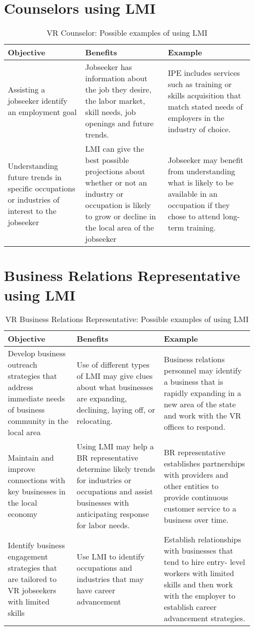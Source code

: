 \documentclass[]{book}
\theoremstyle{definition}
\theoremstyle{definition}
\theoremstyle{definition}
\theoremstyle{remark}
\begin{document}
\section{Counselors using LMI}\label{counselors-using-lmi}

\begin{longtable}[t]{lll}
\caption{\label{tab:unnamed-chunk-2}VR Counselor: Possible examples of using LMI}\\
\toprule
Objective & Benefits & Example\\
\midrule
Assisting a jobseeker identify an employment goal & Jobseeker has information about the job they desire, the labor market, skill needs, job openings and future trends. & IPE includes services such as training or skills acquisition that match stated needs of employers in the industry of choice.\\
Understanding future trends in specific occupations or industries of interest to the jobseeker & LMI can give the best possible projections about whether or not an industry or occupation is likely to grow or decline in the local area of the jobseeker & Jobseeker may benefit from understanding what is likely to be available in an occupation if they chose to attend long-term training.\\
\bottomrule
\end{longtable}

\section{Business Relations Representative using
LMI}\label{business-relations-representative-using-lmi}

\begin{longtable}[t]{lll}
\caption{\label{tab:unnamed-chunk-3}VR Business Relations Representative: Possible examples of using LMI}\\
\toprule
Objective & Benefits & Example\\
\midrule
Develop business outreach strategies that address immediate needs of business community in the local area & Use of different types of LMI may give clues about what businesses are expanding, declining, laying off, or relocating. & Business relations personnel may identify a business that is rapidly expanding in a new area of the state and work with the VR offices to respond.\\
Maintain and improve connections with key businesses in the local economy & Using LMI may help a BR representative determine likely trends for industries or occupations and assist businesses with anticipating response for labor needs. & BR representative establishes partnerships with providers and other entities to provide continuous customer service to a business over time.\\
Identify business engagement strategies that are tailored to VR jobseekers with limited skills & Use LMI to identify occupations and industries that may have career advancement & Establish relationships with businesses that tend to hire entry- level workers with limited skills and then work with the employer to establish career advancement strategies.\\
\bottomrule
\end{longtable}
\end{document}
